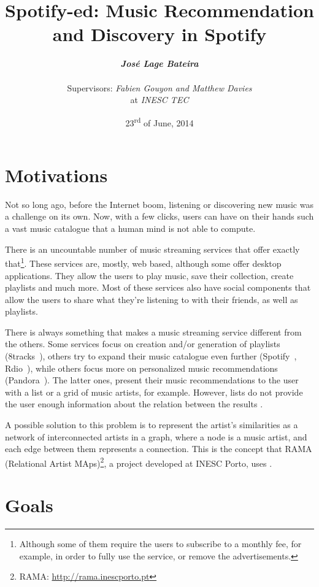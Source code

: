 \documentclass[twocolumn]{article}
\title{
  \huge
  \textbf{
    Spotify-ed: Music Recommendation and Discovery in Spotify
  }
}
\author{
  \large{\emph{\textbf{José Lage Bateira}}} \\ \\
  Supervisors: \emph{Fabien Gouyon and Matthew Davies}  \\
  at \emph{INESC TEC}
}
\date{23\textsuperscript{rd} of June, 2014}
\begin{document}
\maketitle

\thispagestyle{empty}

\section{Motivations}
\label{sec:motivations}

  Not so long ago, before the Internet boom, listening or discovering new music was a challenge on its own.
  Now, with a few clicks, users can have on their hands such a vast music catalogue that a human mind is not able to compute.

  There is an uncountable number of music streaming services that offer exactly that\footnote{Although some of them require the users to subscribe to a monthly fee, for example, in order to fully use the service, or remove the advertisements.}.
  These services are, mostly, web based, although some offer desktop applications.
  They allow the users to play music, save their collection, create playlists and much more.
  Most of these services also have social components that allow the users to share what they're listening to with their friends, as well as playlists.

  There is always something that makes a music streaming service different from the others.
  Some services focus on creation and/or generation of playlists (8tracks~\cite{8tracks}), others try to expand their music catalogue even further (Spotify~\cite{spotify}, Rdio~\cite{rdio}), while others focus more on personalized music recommendations (Pandora~\cite{pandora}).
  The latter ones, present their music recommendations to the user with a list or a grid of music artists, for example.
  However, lists do not provide the user enough information about the relation between the results \cite{Lamere2008}.

  A possible solution to this problem is to represent the artist's similarities as a network of interconnected artists in a graph, where a node is a music artist, and each edge between them represents a connection.
  This is the concept that RAMA (Relational Artist MAps)\footnote{RAMA: \url{http://rama.inescporto.pt}}, a project developed at INESC Porto, uses \cite{Costa2008} \cite{Sarmento2009} \cite{Costa2009} \cite{Gouyon2011}.
  

\section{Goals}
\label{sec:goals}
\end{document}
